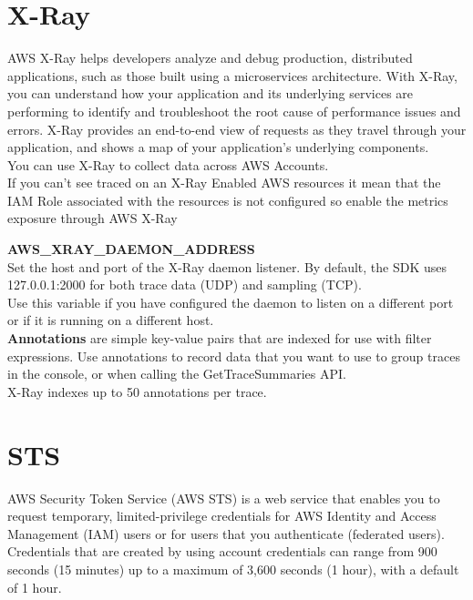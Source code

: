 \documentclass[12pt, letterpaper, twoside]{article}
\begin{document}
\section{X-Ray}
AWS X-Ray helps developers analyze and debug production, distributed applications, such as those built using a microservices 
architecture. With X-Ray, you can understand how your application and its underlying services are performing to identify and 
troubleshoot the root cause of performance issues and errors. X-Ray provides an end-to-end view of requests as they travel 
through your application, and shows a map of your application’s underlying components.\\

You can use X-Ray to collect data across AWS Accounts.\\

If you can't see traced on an X-Ray Enabled AWS resources it mean that the IAM Role associated with the resources is not
configured so enable the metrics exposure through AWS X-Ray

\textbf{AWS\_XRAY\_DAEMON\_ADDRESS}\\
Set the host and port of the X-Ray daemon listener. By default, the SDK uses 127.0.0.1:2000 for both trace data (UDP) 
and sampling (TCP).\\
Use this variable if you have configured the daemon to listen on a different port or if it is running on a different host.\\

\textbf{Annotations} are simple key-value pairs that are indexed for use with filter expressions. Use annotations to record
data that you want to use to group traces in the console, or when calling the GetTraceSummaries API.\\

X-Ray indexes up to 50 annotations per trace.

\section{STS}
AWS Security Token Service (AWS STS) is a web service that enables you to request temporary, limited-privilege credentials 
for AWS Identity and Access Management (IAM) users or for users that you authenticate (federated users).\\
Credentials that are created by using account credentials can range from 900 seconds (15 minutes) up to a 
maximum of 3,600 seconds (1 hour), with a default of 1 hour. 
\end{document}
